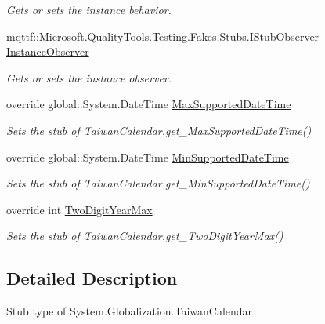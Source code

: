 \begin{DoxyCompactItemize}
\begin{DoxyCompactList}\small\item\em Gets or sets the instance behavior.\end{DoxyCompactList}\item 
mqttf\-::\-Microsoft.\-Quality\-Tools.\-Testing.\-Fakes.\-Stubs.\-I\-Stub\-Observer \hyperlink{class_system_1_1_globalization_1_1_fakes_1_1_stub_taiwan_calendar_abd1d30bef300d0711410825bee131198}{Instance\-Observer}
\begin{DoxyCompactList}\small\item\em Gets or sets the instance observer.\end{DoxyCompactList}\item 
override global\-::\-System.\-Date\-Time \hyperlink{class_system_1_1_globalization_1_1_fakes_1_1_stub_taiwan_calendar_a3a69745df8befbb696a646edce7fb3be}{Max\-Supported\-Date\-Time}
\begin{DoxyCompactList}\small\item\em Sets the stub of Taiwan\-Calendar.\-get\-\_\-\-Max\-Supported\-Date\-Time()\end{DoxyCompactList}\item 
override global\-::\-System.\-Date\-Time \hyperlink{class_system_1_1_globalization_1_1_fakes_1_1_stub_taiwan_calendar_a875e3cc2b0d11118876b797f3208720b}{Min\-Supported\-Date\-Time}
\begin{DoxyCompactList}\small\item\em Sets the stub of Taiwan\-Calendar.\-get\-\_\-\-Min\-Supported\-Date\-Time()\end{DoxyCompactList}\item 
override int \hyperlink{class_system_1_1_globalization_1_1_fakes_1_1_stub_taiwan_calendar_a9cd944494d9863c97bfa0b229f4434f1}{Two\-Digit\-Year\-Max}
\begin{DoxyCompactList}\small\item\em Sets the stub of Taiwan\-Calendar.\-get\-\_\-\-Two\-Digit\-Year\-Max()\end{DoxyCompactList}\end{DoxyCompactItemize}


\subsection{Detailed Description}
Stub type of System.\-Globalization.\-Taiwan\-Calendar



